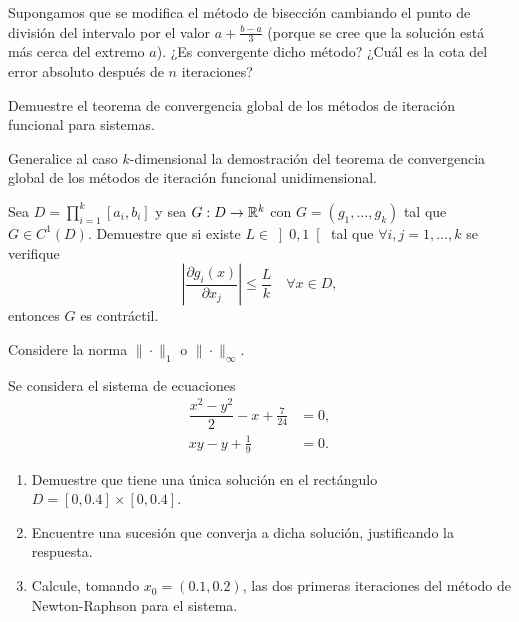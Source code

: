 \begin{ejercicio}\label{ej:1.1.14}
    Supongamos que se modifica el método de bisección cambiando el punto de división del intervalo por el valor $a + \frac{b-a}{3}$ (porque se cree que la solución está más cerca del extremo $a$). ¿Es convergente dicho método? ¿Cuál es la cota del error absoluto después de $n$ iteraciones?
\end{ejercicio}

\begin{ejercicio}\label{ej:1.1.15}
    Demuestre el teorema de convergencia global de los métodos de iteración funcional para sistemas.
    \begin{observacion}
        Generalice al caso $k$-dimensional la demostración del teorema de convergencia global de los métodos de iteración funcional unidimensional.
    \end{observacion}
\end{ejercicio}

\begin{ejercicio}\label{ej:1.1.16}
    Sea $D = \prod\limits_{i=1}^k[a_i, b_i]$ y sea $G : D \to \mathbb{R}^k$ con $G = (g_1, \ldots, g_k)$ tal que $G \in C^1(D)$. Demuestre que si existe $L \in\left]0, 1\right[$ tal que $\forall i, j = 1, \ldots, k$ se verifique
    \begin{equation*}
        \left\lvert \dfrac{\partial g_i(x)}{\partial x_j} \right\rvert \leq \dfrac{L}{k}\quad \forall x \in D,
    \end{equation*}
    entonces $G$ es contráctil.
    \begin{observacion}
        Considere la norma $\| \cdot \|_1$ o $\| \cdot \|_\infty$.
    \end{observacion}
\end{ejercicio}

\begin{ejercicio}\label{ej:1.1.17}
    Se considera el sistema de ecuaciones
    \begin{align*}
        \dfrac{x^2-y^2}{2}-x + \frac{7}{24} &= 0, \\
        xy - y + \frac{1}{9} &= 0.
    \end{align*}
    \begin{enumerate}
        \item Demuestre que tiene una única solución en el rectángulo $D = [0, 0.4] \times [0, 0.4]$.
        \item Encuentre una sucesión que converja a dicha solución, justificando la respuesta.
        \item Calcule, tomando $x_0 = (0.1, 0.2)$, las dos primeras iteraciones del método de Newton-Raphson para el sistema.
    \end{enumerate}
\end{ejercicio}


